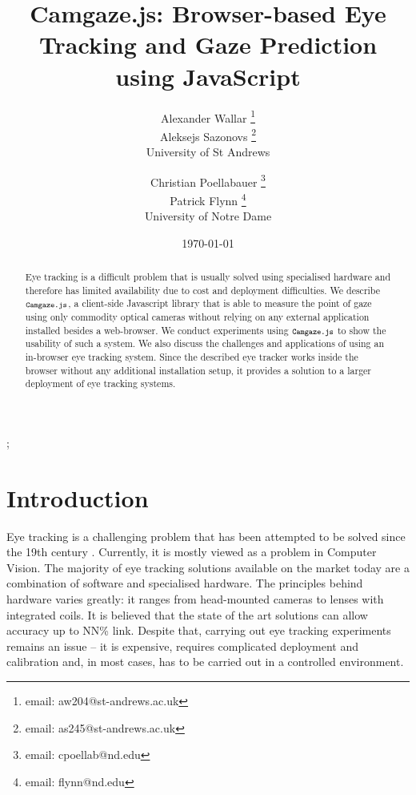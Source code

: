 \documentclass[annual]{acmsiggraph}
\title{Camgaze.js: Browser-based Eye Tracking and Gaze Prediction using
JavaScript}
\author{Alexander Wallar \thanks{email: aw204@st-andrews.ac.uk} \\ Aleksejs
Sazonovs \thanks{email: as245@st-andrews.ac.uk} \\ University of St Andrews
\and Christian Poellabauer \thanks{email: cpoellab@nd.edu} \\ Patrick Flynn
\thanks{email: flynn@nd.edu} \\ University of Notre Dame}
\date{\today}
\newcommand{\Acronym}[1]{\ensuremath{{\small{\texttt{#1}}}}}
\newcommand{\Name}{\Acronym{Camgaze.js}} \newcommand{\False}{\Constant{false}}
\newcommand{\Constant}[1]{\ensuremath{\small{\texttt{#1}}}}
\begin{document}
\maketitle

\begin{abstract}

Eye tracking is a difficult problem that is usually solved using specialised
hardware and therefore has limited availability due to cost and deployment
difficulties. We describe $\Name$, a client-side Javascript library that is
able to measure the point of gaze using only commodity optical cameras without
relying on any external application installed besides a web-browser. We conduct
experiments using $\Name$ to show the usability of such a system.  We also
discuss the challenges and applications of using an in-browser eye tracking
system. Since the described eye tracker works inside the browser without any
additional installation setup, it provides a solution to a larger deployment of
eye tracking systems.

\end{abstract}

\begin{CRcatlist} ;

\end{CRcatlist}

\keywordlist


\copyrightspace

\section{Introduction}

Eye tracking is a challenging problem that has been attempted to be solved
since the 19th century \cite{Ahrens1891}. Currently, it is mostly viewed as a
problem in Computer Vision. The majority of eye tracking solutions available on
the market today are a combination of software and specialised hardware. The
principles behind hardware varies greatly: it ranges from head-mounted cameras
to lenses with integrated coils. It is believed that the state of the art
solutions can allow accuracy up to NN\% {link}. Despite that, carrying out eye
tracking experiments remains an issue – it is expensive, requires complicated
deployment and calibration and, in most cases, has to be carried out in a
controlled environment.
\end{document}
